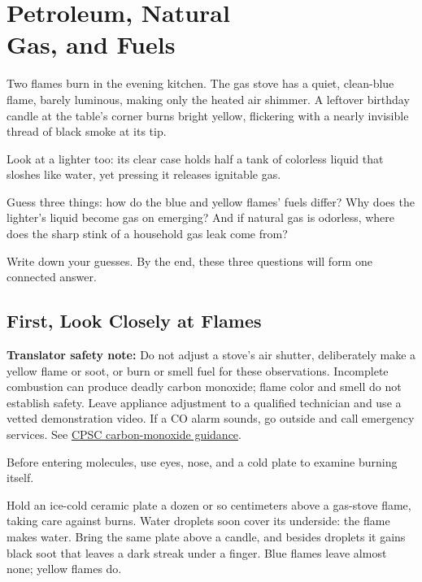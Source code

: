 \chapter[Petroleum, Natural Gas, and Fuels]{Petroleum, Natural\protect\\ Gas, and Fuels}

\begin{kaichang}
Two flames burn in the evening kitchen. The gas stove has a quiet, clean-blue flame, barely luminous, making only the heated air shimmer. A leftover birthday candle at the table's corner burns bright yellow, flickering with a nearly invisible thread of black smoke at its tip.

Look at a lighter too: its clear case holds half a tank of colorless liquid that sloshes like water, yet pressing it releases ignitable gas.

Guess three things: how do the blue and yellow flames' fuels differ? Why does the lighter's liquid become gas on emerging? And if natural gas is odorless, where does the sharp stink of a household gas leak come from?

Write down your guesses. By the end, these three questions will form one connected answer.
\end{kaichang}

\section{First, Look Closely at Flames}

\textbf{Translator safety note:} Do not adjust a stove's air shutter, deliberately make a yellow flame or soot, or burn or smell fuel for these observations. Incomplete combustion can produce deadly carbon monoxide; flame color and smell do not establish safety. Leave appliance adjustment to a qualified technician and use a vetted demonstration video. If a CO alarm sounds, go outside and call emergency services. See \href{https://www.cpsc.gov/safety-education/safety-guides/carbon-monoxide/carbon-monoxide-fact-sheet}{CPSC carbon-monoxide guidance}.

Before entering molecules, use eyes, nose, and a cold plate to examine burning itself.

Hold an ice-cold ceramic plate a dozen or so centimeters above a gas-stove flame, taking care against burns. Water droplets soon cover its underside: the flame makes water. Bring the same plate above a candle, and besides droplets it gains black soot that leaves a dark streak under a finger. Blue flames leave almost none; yellow flames do.

